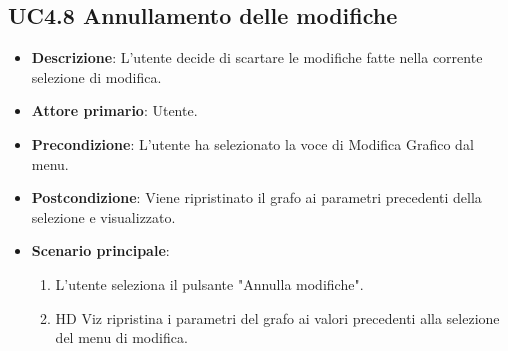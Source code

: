 \subsection{UC4.8 Annullamento delle modifiche}
\label{ssub:uc4.8}
\begin{itemize}
    \item \textbf{Descrizione}: L'utente decide di scartare le modifiche fatte nella corrente selezione di modifica.

    \item \textbf{Attore primario}: Utente.
    
    \item \textbf{Precondizione}:   L'utente ha selezionato la voce di Modifica Grafico dal menu.
    \item \textbf{Postcondizione}:  Viene ripristinato il grafo ai parametri precedenti della selezione e visualizzato.

	\item \textbf{Scenario principale}:
        \begin{enumerate}

            \item L'utente seleziona il pulsante "Annulla modifiche".
            \item HD Viz ripristina i parametri del grafo ai valori precedenti alla selezione del menu di modifica.
        
        \end{enumerate}
\end{itemize}



